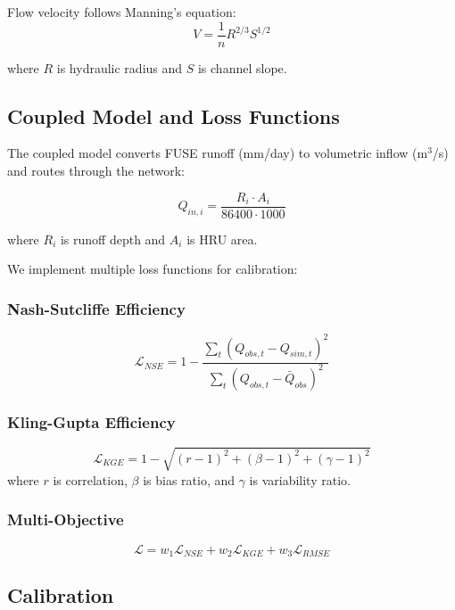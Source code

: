 \documentclass[11pt,a4paper]{article}
\begin{document}
Flow velocity follows Manning's equation:
\begin{equation}
    V = \frac{1}{n} R^{2/3} S^{1/2}
\end{equation}

where $R$ is hydraulic radius and $S$ is channel slope.

\subsection{Coupled Model and Loss Functions}

The coupled model converts FUSE runoff (mm/day) to volumetric inflow (m$^3$/s) and routes through the network:

\begin{equation}
    Q_{in,i} = \frac{R_i \cdot A_i}{86400 \cdot 1000}
\end{equation}

where $R_i$ is runoff depth and $A_i$ is HRU area.

We implement multiple loss functions for calibration:

\subsubsection{Nash-Sutcliffe Efficiency}
\begin{equation}
    \mathcal{L}_{NSE} = 1 - \frac{\sum_t (Q_{obs,t} - Q_{sim,t})^2}{\sum_t (Q_{obs,t} - \bar{Q}_{obs})^2}
\end{equation}

\subsubsection{Kling-Gupta Efficiency}
\begin{equation}
    \mathcal{L}_{KGE} = 1 - \sqrt{(r-1)^2 + (\beta-1)^2 + (\gamma-1)^2}
\end{equation}
where $r$ is correlation, $\beta$ is bias ratio, and $\gamma$ is variability ratio.

\subsubsection{Multi-Objective}
\begin{equation}
    \mathcal{L} = w_1 \mathcal{L}_{NSE} + w_2 \mathcal{L}_{KGE} + w_3 \mathcal{L}_{RMSE}
\end{equation}

\subsection{Calibration}
\end{document}
